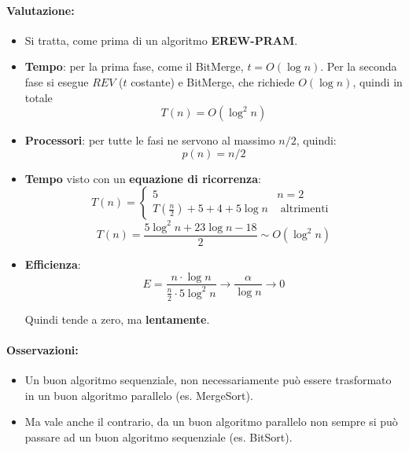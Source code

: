 \paragraph{Valutazione: }
\begin{itemize}
	\item Si tratta, come prima di un algoritmo \textbf{EREW-PRAM}.\\
	
	\item \textbf{Tempo}: per la prima fase, come il BitMerge, $t = O(\log n)$. Per la seconda fase si esegue $REV$ ($t$ costante) e BitMerge, che richiede $O(\log n)$, quindi in totale
	$$ T(n) = O (\log^2 n) $$
	\nn
	
	\item \textbf{Processori}: per tutte le fasi ne servono al massimo $n/2$, quindi:
	$$ p(n) = n/2 $$
	\nn
	
	\item \textbf{Tempo} visto con un \textbf{equazione di ricorrenza}: 
	$$ T(n) = \begin{cases}
		5 & n = 2 \\
		T(\frac{n}{2}) + 5 + 4 + 5 \log n& \text{ altrimenti }
	\end{cases}
	$$
	$$ T(n) = \frac{5 \log^2 n + 23 \log n - 18}{2} \sim O (\log^2 n) $$
	\nn
	
	\item \textbf{Efficienza}:
	$$ E = \frac{n \cdot  \log n}{\frac{n}{2} \cdot 5 \log^2 n} \rightarrow \frac{\alpha}{\log n} \rightarrow 0 $$
	
	Quindi tende a zero, ma \textbf{lentamente}.\\
\end{itemize}


\newpage

\paragraph{Osservazioni: }
\begin{itemize}
	\item Un buon algoritmo sequenziale, non necessariamente può essere trasformato in un buon algoritmo parallelo (es. MergeSort).\\
	
	\item Ma vale anche il contrario, da un buon algoritmo parallelo non sempre si può passare ad un buon algoritmo sequenziale (es. BitSort).\\
\end{itemize}

